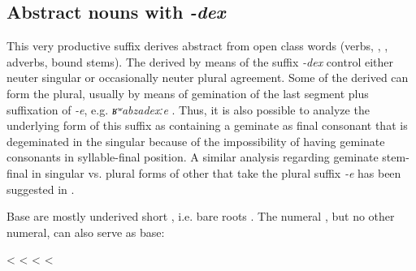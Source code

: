 
\subsection{Abstract nouns with \textit{-dex}}
\label{ssec:Abstract nouns with -dex}

This very productive suffix derives abstract  from open class words (verbs, , , adverbs, bound stems). The  derived by means of the suffix \textit{-dex} control either neuter singular  or occasionally neuter plural agreement. Some of the derived  can form the plural, usually by means of gemination of the last segment plus suffixation of \textit{-e}, e.g. \textit{ʁʷabzadexːe} . Thus, it is also possible to analyze the underlying form of this suffix as containing a geminate as final consonant that is degeminated in the singular because of the impossibility of having geminate consonants in syllable-final position. A similar analysis regarding geminate stem-final  in singular vs. plural forms of other  that take the plural suffix \textit{-e} has been suggested in . 

Base  are mostly underived short , i.e. bare roots . The numeral  , but no other numeral, can also serve as base: 
%
\begin{exe}
	\ex	\label{kːuš-dexhunger}
	\begin{xlist}
		\TabPositions{14em,16em}
		\ex	{} 	\tab	<	\tab	{} 
		\ex	{} 	\tab	<	\tab	{} 
		\ex	{} 	\tab	<	\tab	{} 
		\ex	{} 		\tab	<	\tab	{} 
	\end{xlist}
\end{exe}

